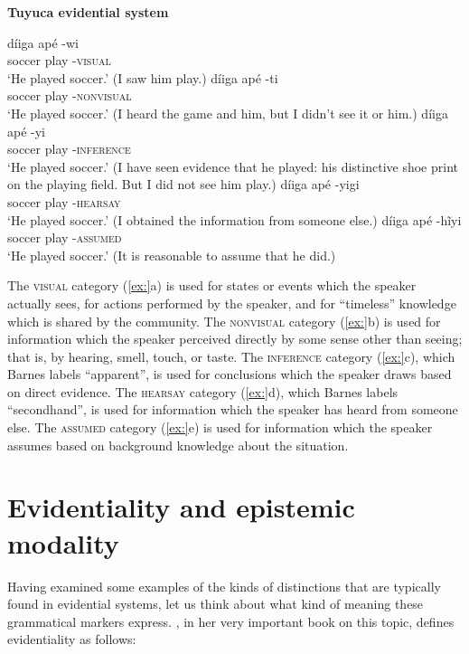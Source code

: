 \textbf{Tuyuca evidential system} \citep{Barnes1984}

\ea
\ea \gll  díiga  apé  -wi  \\
soccer  play  -\textsc{visual}\\
\glt ‘He played soccer.’ (I saw him play.)
\ex \gll díiga  apé  -ti\\
soccer  play  -\textsc{nonvisual}\\
\glt ‘He played soccer.’ (I heard the game and him, but I didn’t see it or him.)
\ex \gll  díiga  apé  -yi\\
soccer  play  -\textsc{inference}\\
\glt ‘He played soccer.’ (I have seen evidence that he played: his distinctive shoe print on the playing field. But I did not see him play.)
\ex \gll  díiga  apé  -yigi\\
soccer  play  -\textsc{hearsay}\\
\glt ‘He played soccer.’ (I obtained the information from someone else.)
\ex \gll  díiga  apé  -hĩyi\\
soccer  play  -\textsc{assumed}\\
\glt ‘He played soccer.’ (It is reasonable to assume that he did.)
\z \z


The \textsc{visual} category (\ref{ex:}a) is used for states or events which the speaker actually sees, for actions performed by the speaker, and for “timeless” knowledge which is shared by the community. The \textsc{nonvisual} category (\ref{ex:}b) is used for information which the speaker perceived directly by some sense other than seeing; that is, by hearing, smell, touch, or taste. The \textsc{inference} category (\ref{ex:}c), which Barnes labels “apparent”, is used for conclusions which the speaker draws based on direct evidence. The \textsc{hearsay} category (\ref{ex:}d), which Barnes labels “secondhand”, is used for information which the speaker has heard from someone else. The \textsc{assumed} category (\ref{ex:}e) is used for information which the speaker assumes based on background knowledge about the situation.


\section{Evidentiality and epistemic modality}\label{sec:} %

Having examined some examples of the kinds of distinctions that are typically found in evidential systems, let us think about what kind of meaning these grammatical markers express. \citet{Aikhenvald2004}, in her very important book on this topic, defines evidentiality as follows:


